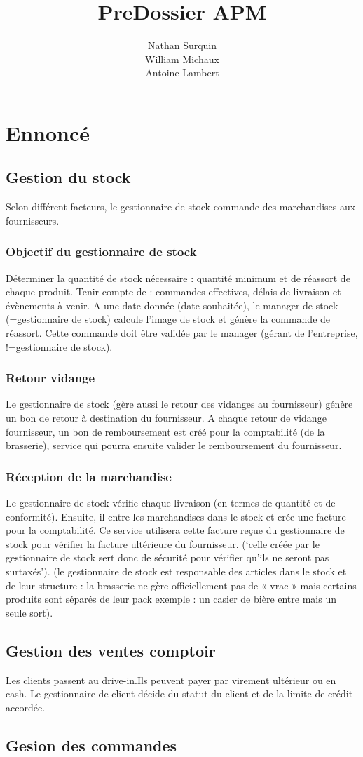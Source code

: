 \documentclass[a4paper,11pt]{article}
\title{PreDossier APM}
\author{Nathan Surquin\\
William Michaux\\
Antoine Lambert}
\begin{document}
\maketitle
\newpage
\tableofcontents
\newpage
\section{Ennoncé}
\subsection{Gestion du stock}
Selon différent facteurs, le gestionnaire de stock commande des marchandises aux fournisseurs.
\subsubsection{Objectif du gestionnaire de stock}
Déterminer la quantité de stock nécessaire : quantité minimum et de réassort de chaque     produit. Tenir compte de : commandes effectives, délais de livraison et évènements à venir. A une date donnée (date souhaitée), le manager de stock (=gestionnaire de stock) calcule l’image de stock et génère la commande de réassort. Cette commande doit être validée par le manager (gérant de l’entreprise, !=gestionnaire de stock).
\subsubsection{Retour vidange}
Le gestionnaire de stock (gère aussi le retour des vidanges au fournisseur) génère un bon de retour à destination du fournisseur. A chaque retour de vidange fournisseur, un bon de remboursement est créé pour la comptabilité (de la brasserie), service qui pourra ensuite valider le remboursement du fournisseur.
\subsubsection{Réception de la marchandise}
Le gestionnaire de stock vérifie chaque livraison (en termes de quantité et de conformité). Ensuite, il entre les marchandises dans le stock et crée une facture pour la comptabilité. Ce service utilisera cette facture reçue du gestionnaire de stock pour vérifier la facture ultérieure du fournisseur. (‘celle créée par le gestionnaire de stock sert donc de sécurité pour vérifier qu’ils ne seront pas surtaxés’). (le gestionnaire de stock est responsable des articles dans le stock et de leur structure : la brasserie ne gère officiellement pas de « vrac » mais certains produits sont séparés de leur pack exemple : un casier de bière entre mais un seule sort).
\subsection{Gestion des ventes comptoir}
Les clients passent au drive-in.Ils peuvent payer par virement ultérieur ou en cash. Le gestionnaire de client décide du statut du client et de la limite de crédit accordée.
\subsection{Gesion des commandes}
\end{document}
